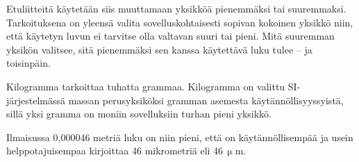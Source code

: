 

Etuliitteitä käytetään siis muuttamaan yksikköä pienemmäksi tai suuremmaksi. Tarkoituksena on yleensä valita sovelluskohtaisesti sopivan kokoinen yksikkö niin, että käytetyn luvun ei tarvitse olla valtavan suuri tai pieni. Mitä suuremman yksikön valitsee, sitä pienemmäksi sen kanssa käytettävä luku tulee -- ja toisinpäin.

\begin{esimerkki}
Kilogramma tarkoittaa tuhatta grammaa. Kilogramma on valittu SI-järjestelmässä massan perusyksiköksi gramman asemesta käytännöllisyyssyistä, sillä yksi gramma on moniin sovelluksiin turhan pieni yksikkö.
\end{esimerkki}

\begin{esimerkki}
Ilmaisussa 0,000046 metriä luku on niin pieni, että on käytännöllisempää ja usein helppotajuisempaa kirjoittaa 46 mikrometriä eli 46\,$\upmu$m.
\end{esimerkki}

